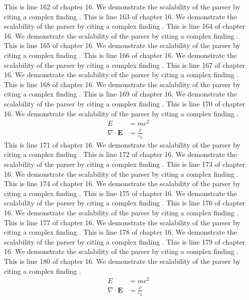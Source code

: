 This is line 162 of chapter 16. We demonstrate the scalability of the parser by citing a complex finding \cite{ref16_162}.
This is line 163 of chapter 16. We demonstrate the scalability of the parser by citing a complex finding \cite{ref16_163}.
This is line 164 of chapter 16. We demonstrate the scalability of the parser by citing a complex finding \cite{ref16_164}.
This is line 165 of chapter 16. We demonstrate the scalability of the parser by citing a complex finding \cite{ref16_165}.
This is line 166 of chapter 16. We demonstrate the scalability of the parser by citing a complex finding \cite{ref16_166}.
This is line 167 of chapter 16. We demonstrate the scalability of the parser by citing a complex finding \cite{ref16_167}.
This is line 168 of chapter 16. We demonstrate the scalability of the parser by citing a complex finding \cite{ref16_168}.
This is line 169 of chapter 16. We demonstrate the scalability of the parser by citing a complex finding \cite{ref16_169}.
This is line 170 of chapter 16. We demonstrate the scalability of the parser by citing a complex finding \cite{ref16_170}.
\begin{align*}
  E &= mc^2 \\
  \nabla \cdot \mathbf{E} &= \frac{\rho}{\varepsilon_0}
\end{align*}
This is line 171 of chapter 16. We demonstrate the scalability of the parser by citing a complex finding \cite{ref16_171}.
This is line 172 of chapter 16. We demonstrate the scalability of the parser by citing a complex finding \cite{ref16_172}.
This is line 173 of chapter 16. We demonstrate the scalability of the parser by citing a complex finding \cite{ref16_173}.
This is line 174 of chapter 16. We demonstrate the scalability of the parser by citing a complex finding \cite{ref16_174}.
This is line 175 of chapter 16. We demonstrate the scalability of the parser by citing a complex finding \cite{ref16_175}.
This is line 176 of chapter 16. We demonstrate the scalability of the parser by citing a complex finding \cite{ref16_176}.
This is line 177 of chapter 16. We demonstrate the scalability of the parser by citing a complex finding \cite{ref16_177}.
This is line 178 of chapter 16. We demonstrate the scalability of the parser by citing a complex finding \cite{ref16_178}.
This is line 179 of chapter 16. We demonstrate the scalability of the parser by citing a complex finding \cite{ref16_179}.
This is line 180 of chapter 16. We demonstrate the scalability of the parser by citing a complex finding \cite{ref16_180}.
\begin{align*}
  E &= mc^2 \\
  \nabla \cdot \mathbf{E} &= \frac{\rho}{\varepsilon_0}
\end{align*}
